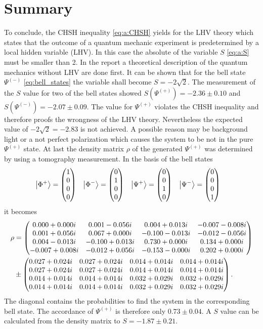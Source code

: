\section{Summary}
To conclude, the CHSH inequality \eqref{eq:a:CHSH} yields for the LHV theory which states that the outcome of a quantum mechanic experiment is predetermined by a local hidden variable (LHV).
In this case the absolute of the variable $S$ \eqref{eq:a:S} must be smaller than 2.
In the report a theoretical description of the quantum mechanics without LHV are done first.
It can be shown that for the bell state $\Psi^{(-)}$ \eqref{eq:bell_states} the variable shall become $S=-2\sqrt{2}$.
The measurement of the $S$ value for two of the bell states showed $S(\Psi^{(+)})=-2.36\pm0.10$ and $S(\Psi^{(-)})=-2.07\pm0.09$.
The value for $\Psi^{(+)}$ violates the CHSH inequality and therefore proofs the wrongness of the LHV theory.
Nevertheless the expected value of $-2\sqrt{2}=-2.83$ is not achieved.
A possible reason may be background light or a not perfect polarization which causes the system to be not in the pure $\Psi^{(+)}$ state.
At last the density matrix $\rho$ of the generated $\Psi^{(+)}$ was determined by using a tomography measurement.
In the basis of the bell states
\begin{align*}
\ket{\Phi^{+}}
    &=\begin{pmatrix}1\\0\\0\\0\end{pmatrix}
    &\ket{\Phi^{-}}
    &=\begin{pmatrix}0\\1\\0\\0\end{pmatrix}
    &\ket{\Psi^{+}}
    &=\begin{pmatrix}0\\0\\1\\0\end{pmatrix}
    &\ket{\Psi^{-}}
    &=\begin{pmatrix}0\\0\\0\\1\end{pmatrix}
\end{align*}
it becomes
\begin{align*}
\rho
    &=\begin{pmatrix} 0.000+0.000i &0.001-0.056i &0.004+0.013i &-0.007-0.008i\\ 0.001+0.056i &0.067+0.000i &-0.100-0.013i &-0.012-0.056i\\ 0.004-0.013i &-0.100+0.013i &0.730+0.000i &0.134+0.000i\\ -0.007+0.008i &-0.012+0.056i &-0.153-0.000i &0.202+0.000i \end{pmatrix}
    \\
    &\pm \begin{pmatrix} 0.027+0.024i &0.027+0.024i &0.014+0.014i &0.014+0.014i\\ 0.027+0.024i &0.027+0.024i &0.014+0.014i &0.014+0.014i\\ 0.014+0.014i &0.014+0.014i &0.032+0.029i &0.032+0.029i\\ 0.014+0.014i &0.014+0.014i &0.032+0.029i &0.032+0.029i \end{pmatrix} .
\end{align*}
The diagonal contains the probabilities to find the system in the corresponding bell state.
The accordance of $\Psi^{(+)}$ is therefore only $0.73\pm0.04$.
A $S$ value can be calculated from the density matrix to $S=-1.87\pm 0.21$.